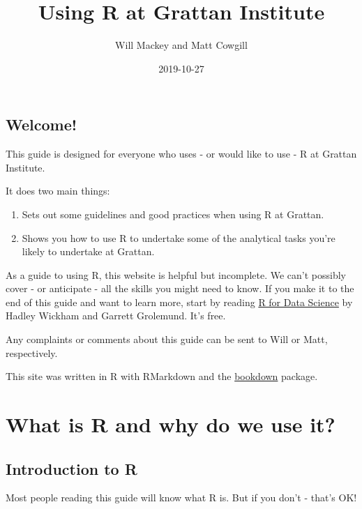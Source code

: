 \documentclass[]{book}
\title{Using R at Grattan Institute}
\author{Will Mackey and Matt Cowgill}
\date{2019-10-27}
\providecommand{\tightlist}{%
  \setlength{\itemsep}{0pt}\setlength{\parskip}{0pt}}
\begin{document}
\maketitle

{
\setcounter{tocdepth}{1}
\tableofcontents
}
\hypertarget{welcome}{%
\chapter*{Welcome!}\label{welcome}}

This guide is designed for everyone who uses - or would like to use - R at Grattan Institute.

It does two main things:

\begin{enumerate}
\def\labelenumi{\arabic{enumi}.}
\tightlist
\item
  Sets out some guidelines and good practices when using R at Grattan.
\item
  Shows you how to use R to undertake some of the analytical tasks you're likely to undertake at Grattan.
\end{enumerate}

As a guide to using R, this website is helpful but incomplete. We can't possibly cover - or anticipate - all the skills you might need to know. If you make it to the end of this guide and want to learn more, start by reading \href{https://r4ds.had.co.nz}{R for Data Science} by Hadley Wickham and Garrett Grolemund. It's free.

Any complaints or comments about this guide can be sent to Will or Matt, respectively.

This site was written in R with RMarkdown and the \href{https://bookdown.org}{bookdown} package.

\hypertarget{part-what-is-r-and-why-do-we-use-it}{%
\part{What is R and why do we use it?}\label{part-what-is-r-and-why-do-we-use-it}}

\hypertarget{introduction-to-r}{%
\chapter{Introduction to R}\label{introduction-to-r}}

Most people reading this guide will know what R is. But if you don't - that's OK!
\end{document}
